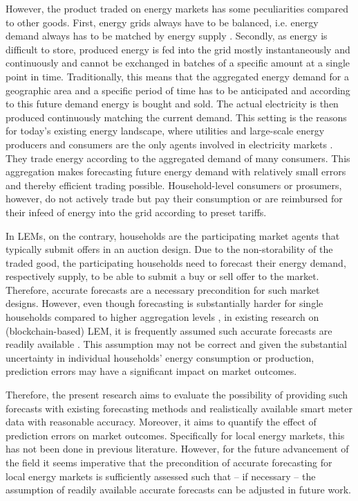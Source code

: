 However, the product traded on energy markets has some peculiarities compared to other goods. First, energy grids always have to be balanced, i.e. energy demand always has to be matched by energy supply \citep{Weron:2006}. Secondly, as energy is difficult to store, produced energy is fed into the grid mostly instantaneously and continuously and cannot be exchanged in batches of a specific amount at a single point in time. Traditionally, this means that the aggregated energy demand for a geographic area and a specific period of time has to be anticipated and according to this future demand energy is bought and sold. The actual electricity is then produced continuously matching the current demand. This setting is the reasons for today’s existing energy landscape, where utilities and large-scale energy producers and consumers are the only agents involved in electricity markets \citep{Weron:2006}. They trade energy according to the aggregated demand of many consumers. This aggregation makes forecasting future energy demand with relatively small errors \citep{Meer:2018, Wang:2018} and thereby efficient trading possible. Household-level consumers or prosumers, however, do not actively trade but pay their consumption or are reimbursed for their infeed of energy into the grid according to preset tariffs. 

In LEMs, on the contrary, households are the participating market agents that typically submit offers in an auction design. Due to the non-storability of the traded good, the participating households need to forecast their energy demand, respectively supply, to be able to submit a buy or sell offer to the market. Therefore, accurate forecasts are a necessary precondition for such market designs. However, even though forecasting is substantially harder for single households compared to higher aggregation levels \citep{Wang:2018}, in existing research on (blockchain-based) LEM, it is frequently assumed such accurate forecasts are readily available \citep{Rosen:2013, Mengelkamp2018c, Lamparter:2010, Buchmann:2013, Mengelkamp:2018a}. This assumption may not be correct and given the substantial uncertainty in individual households' energy consumption or production, prediction errors may have a significant impact on market outcomes.

Therefore, the present research aims to evaluate the possibility of providing such forecasts with existing forecasting methods and realistically available smart meter data with reasonable accuracy. Moreover, it aims to quantify the effect of prediction errors on market outcomes. Specifically for local energy markets, this has not been done in previous literature. However, for the future advancement of the field it seems imperative that the precondition of accurate forecasting for local energy markets is sufficiently assessed such that -- if necessary -- the assumption of readily available accurate forecasts can be adjusted in future work.

